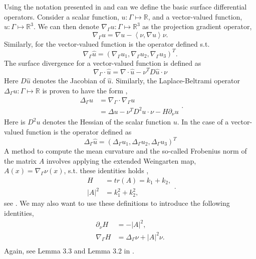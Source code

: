 Using the notation presented in \cite{dougan2012first} and \cite{kovacs2021convergent} can we define the basic surface differential operators. Consider a scalar function, $u: \Gamma \mapsto \mathbb{R} $, and a vector-valued function, $\hat{u}: \Gamma  \mapsto \mathbb{R} ^3$. We can then denote $ \nabla _{\Gamma } u: \Gamma \mapsto \mathbb{R} ^{3}$ as the projection gradient operator,
$$
\nabla_{\Gamma
} u  = \nabla u - \left<\nu, \nabla u \right> \nu.
$$
Similarly, for the vector-valued function is the operator defined s.t.
$$\nabla_{\Gamma } \hat{u} = \left( \nabla_{\Gamma } u_{1},\nabla_{\Gamma } u_{2},\nabla_{\Gamma } u_{3}   \right)^{T}.$$ The surface divergence for a vector-valued function is defined as \[
\nabla_{\Gamma } \cdot \hat{u} = \nabla  \cdot \hat{u} - \nu^{T} D \hat{u} \cdot \nu
\]
Here $D\hat{u}$ denotes the Jacobian of $\hat{u}$. Similarly, the Laplace-Beltrami operator $\Delta _{\Gamma }u  : \Gamma \mapsto \mathbb{R}$  is proven to have the form \cite[Lemma 1]{xu2003eulerian},
\begin{equation*}
    \begin{split}
 \Delta _{\Gamma } u  & = \nabla _{\Gamma } \cdot  \nabla _{\Gamma }u \\
 &=  \Delta u  - \nu ^{T} D^2 u \cdot \nu - H \partial _{\nu } u
    \end{split}
.\end{equation*}
Here is $D^2u$ denotes the Hessian of the scalar function $u$. In the case of a vector-valued function is the operator defined as \[
\Delta _{\Gamma } \hat{u} = \left( \Delta _{\Gamma } u_{1}, \Delta _{\Gamma } u_{2}, \Delta _{\Gamma } u_{3} \right)^{T}
\]
A method to compute the mean curvature and the so-called Frobenius norm of the matrix $A$ involves applying the
extended Weingarten map, $ A\left( x \right) = \nabla_{\Gamma } \nu \left( x \right) $, s.t. these identities holds ,
\begin{equation*}
    \begin{split}
    H & = tr(A) = k_{1} + k_{2}, \\
    \left\lvert A \right\rvert^{2}  & = k_{1}^2 + k_{2}^2,
    \end{split}
.\end{equation*}
see \cite{kovacs2021convergent}.
We may also want to use these definitions to introduce the following identities,
\[
    \begin{split}
         \partial _{\nu } H & = - \left\lvert A \right\rvert ^{2}, \\
    \nabla _{\Gamma } H & = \Delta  _{\Gamma } \nu  + \left\lvert A \right\rvert ^2 \nu.  \\
    \end{split}
\]
Again, see Lemma 3.3 and Lemma 3.2 in \cite{dougan2012first}.

